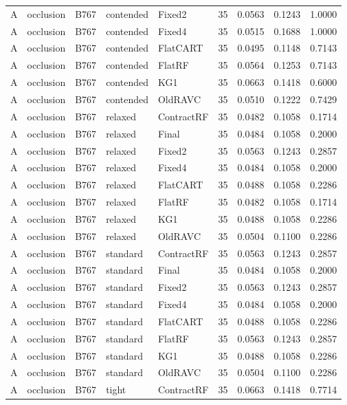 \begin{longtable}{@{}lllllllll@{}}
A & occlusion & B767 & contended & Fixed2 & 35 & 0.0563 & 0.1243 & 1.0000\\
A & occlusion & B767 & contended & Fixed4 & 35 & 0.0515 & 0.1688 & 1.0000\\
A & occlusion & B767 & contended & FlatCART & 35 & 0.0495 & 0.1148 & 0.7143\\
A & occlusion & B767 & contended & FlatRF & 35 & 0.0564 & 0.1253 & 0.7143\\
A & occlusion & B767 & contended & KG1 & 35 & 0.0663 & 0.1418 & 0.6000\\
A & occlusion & B767 & contended & OldRAVC & 35 & 0.0510 & 0.1222 & 0.7429\\
A & occlusion & B767 & relaxed & ContractRF & 35 & 0.0482 & 0.1058 & 0.1714\\
A & occlusion & B767 & relaxed & Final & 35 & 0.0484 & 0.1058 & 0.2000\\
A & occlusion & B767 & relaxed & Fixed2 & 35 & 0.0563 & 0.1243 & 0.2857\\
A & occlusion & B767 & relaxed & Fixed4 & 35 & 0.0484 & 0.1058 & 0.2000\\
A & occlusion & B767 & relaxed & FlatCART & 35 & 0.0488 & 0.1058 & 0.2286\\
A & occlusion & B767 & relaxed & FlatRF & 35 & 0.0482 & 0.1058 & 0.1714\\
A & occlusion & B767 & relaxed & KG1 & 35 & 0.0488 & 0.1058 & 0.2286\\
A & occlusion & B767 & relaxed & OldRAVC & 35 & 0.0504 & 0.1100 & 0.2286\\
A & occlusion & B767 & standard & ContractRF & 35 & 0.0563 & 0.1243 & 0.2857\\
A & occlusion & B767 & standard & Final & 35 & 0.0484 & 0.1058 & 0.2000\\
A & occlusion & B767 & standard & Fixed2 & 35 & 0.0563 & 0.1243 & 0.2857\\
A & occlusion & B767 & standard & Fixed4 & 35 & 0.0484 & 0.1058 & 0.2000\\
A & occlusion & B767 & standard & FlatCART & 35 & 0.0488 & 0.1058 & 0.2286\\
A & occlusion & B767 & standard & FlatRF & 35 & 0.0563 & 0.1243 & 0.2857\\
A & occlusion & B767 & standard & KG1 & 35 & 0.0488 & 0.1058 & 0.2286\\
A & occlusion & B767 & standard & OldRAVC & 35 & 0.0504 & 0.1100 & 0.2286\\
A & occlusion & B767 & tight & ContractRF & 35 & 0.0663 & 0.1418 & 0.7714\\

\end{longtable}
